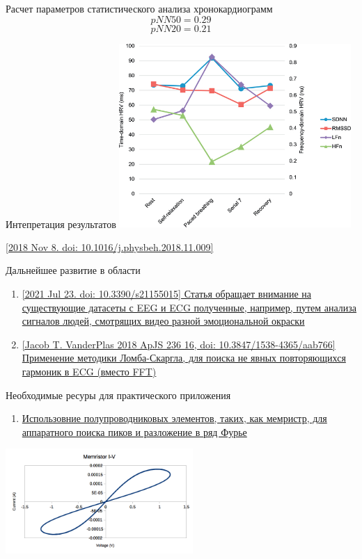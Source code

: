 \documentclass[xcolor=table]{beamer}
\begin{document}
\begin{frame}{Расчет параметров статистического анализа хронокардиограмм}
    \centering
    \Large
    $$pNN50 = 0.29$$
    $$pNN20 = 0.21$$
\end{frame}


\begin{frame}{Интепретация результатов}
\centering
\includegraphics[height=7cm]{images/nihms-1022910-f0001.jpg}
\vspace{5}

\small \href{https://www.ncbi.nlm.nih.gov/pmc/articles/PMC6492031/}{[2018 Nov 8. doi: 10.1016/j.physbeh.2018.11.009]}
\end{frame}


\begin{frame}{Дальнейшее развитие в области}
\begin{enumerate} 
    \item \href{https://www.ncbi.nlm.nih.gov/pmc/articles/PMC8348698/}{[2021 Jul 23. doi: 10.3390/s21155015] Статья обращает внимание на существующие датасеты с EEG и ECG полученные, например, путем анализа сигналов людей, смотрящих видео разной эмоциональной окраски}
    \item \href{https://iopscience.iop.org/article/10.3847/1538-4365/aab766}{[Jacob T. VanderPlas 2018 ApJS 236 16, doi: 10.3847/1538-4365/aab766] Применение методики Ломба-Скаргла, для поиска не явных повторяющихся гармоник в ECG (вместо FFT)}
\end{enumerate}
    
\end{frame}


\begin{frame}{Необходимые ресуры для практического приложения}
\begin{enumerate}
    \item \href{https://www.intechopen.com/chapters/53607}{Использовние полупроводниковых элементов, таких, как
    мемристр, для аппаратного поиска пиков и разложение в ряд Фурье}
\end{enumerate}
\centering
\includegraphics[height=4cm]{MemristorI-V.png}
\end{frame}
\end{document}
